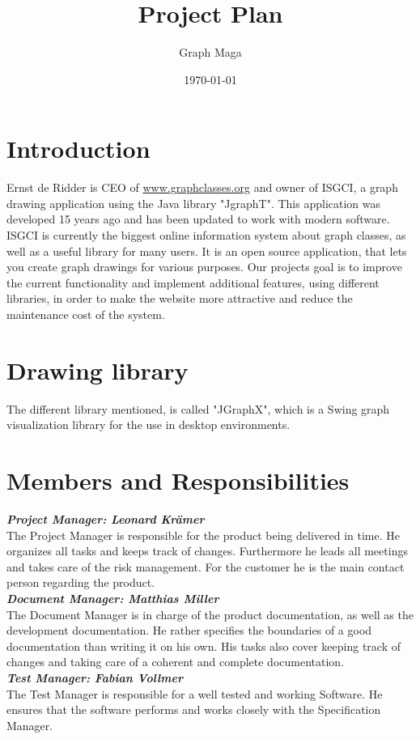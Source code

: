 \documentclass[11pt,a4paper]{article}
\begin{document}
\title{Project Plan}
\author{Graph Maga}
\date{\today}
\maketitle

\tableofcontents


\clearpage

\section{Introduction}
Ernst de Ridder is CEO of \url{www.graphclasses.org} and owner of ISGCI, a graph drawing application using the Java library "JgraphT". This application was developed 15 years ago and has been updated to work with modern software. ISGCI is currently the biggest online information system about graph classes, as well as a useful library for many users. It is an open source application, that lets you create graph drawings for various purposes. Our projects goal is to improve the current functionality and implement additional features, using different libraries, in order to make the website more attractive and reduce the maintenance cost of the system.


\section{Drawing library}
The different library mentioned, is called "JGraphX", which is a Swing graph visualization library for the use in desktop environments.

\section{Members and Responsibilities}

{\small 
\hspace*{0.6cm}\textbf{\textit{Project Manager: Leonard Krämer}} \\
{\footnotesize The Project Manager is responsible for the product being delivered in time. He organizes all tasks and keeps track of changes. Furthermore he leads all meetings and takes care of the risk management. For the customer he is the main contact person regarding the product.  }\\

\textbf{\textit{Document Manager: Matthias Miller}}\\
{\footnotesize The Document Manager is in charge of the product documentation, as well as the development documentation. He rather specifies the boundaries of a good documentation than writing it on his own. His tasks also cover keeping track of changes and taking care of a coherent and complete documentation.} \\

\textbf{\textit{Test Manager: Fabian Vollmer}}\\
{\footnotesize The Test Manager is responsible for a well tested and working Software. He ensures that the software performs and works closely with the Specification Manager.  }}\\
\end{document}
